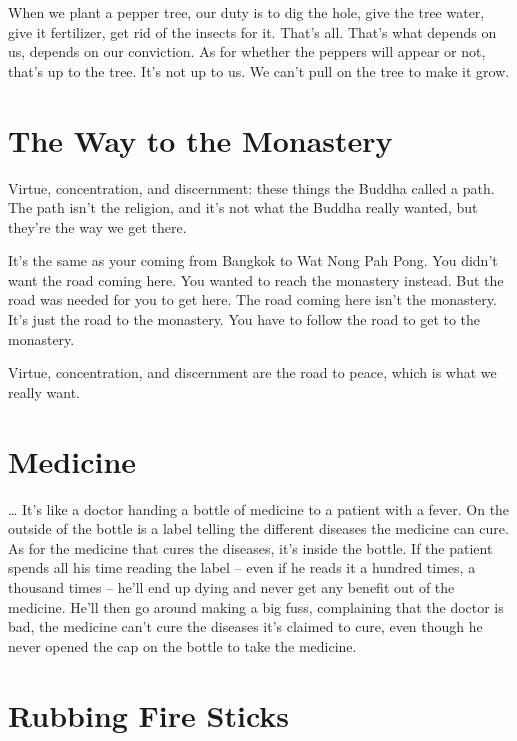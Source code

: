 When we plant a pepper tree, our duty is to dig the hole, give the tree water, give it fertilizer, get rid of the insects for it. That's all. That's what depends on us, depends on our conviction. As for whether the peppers will appear or not, that's up to the tree. It's not up to us. We can't pull on the tree to make it grow.

\clearpage

\section{The Way to the Monastery}

Virtue, concentration, and discernment: these things the Buddha called a path. The path isn't the religion, and it's not what the Buddha really wanted, but they're the way we get there.

It's the same as your coming from Bangkok to Wat Nong Pah Pong. You didn't want the road coming here. You wanted to reach the monastery instead. But the road was needed for you to get here. The road coming here isn't the monastery. It's just the road to the monastery. You have to follow the road to get to the monastery. 

Virtue, concentration, and discernment are the road to peace, which is what we really want.

\vspace*{-\baselineskip}
\section{Medicine}

\enlargethispage{\baselineskip}
\ldots{} It's like a doctor handing a bottle of medicine to a patient with a fever. On the outside of the bottle is a label telling the different diseases the medicine can cure. As for the medicine that cures the diseases, it's inside the bottle. If the patient spends all his time reading the label -- even if he reads it a hundred times, a thousand times -- he'll end up dying and never get any benefit out of the medicine. He'll then go around making a big fuss, complaining that the doctor is bad, the medicine can't cure the diseases it's claimed to cure, even though he never opened the cap on the bottle to take the medicine.

\clearpage

\section{Rubbing Fire Sticks}

